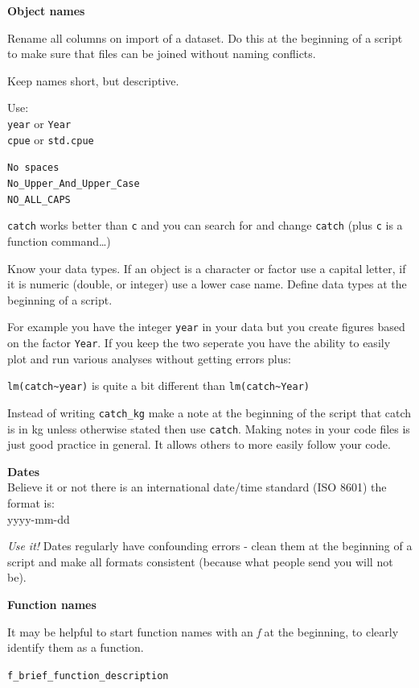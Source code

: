 \documentclass[
]{article}
\begin{document}
\textbf{Object names}

Rename all columns on import of a dataset. Do this at the beginning of a
script to make sure that files can be joined without naming conflicts.

Keep names short, but descriptive.

Use:\\
\texttt{year} or \texttt{Year}\\
\texttt{cpue} or \texttt{std.cpue}

\texttt{No\ spaces}~\\
\texttt{No\_Upper\_And\_Upper\_Case}~\\
\texttt{NO\_ALL\_CAPS}

\texttt{catch} works better than \texttt{c} and you can search for and
change \texttt{catch} (plus \texttt{c} is a function command\ldots)

Know your data types. If an object is a character or factor use a
capital letter, if it is numeric (double, or integer) use a lower case
name. Define data types at the beginning of a script.

For example you have the integer \texttt{year} in your data but you
create figures based on the factor \texttt{Year}. If you keep the two
seperate you have the ability to easily plot and run various analyses
without getting errors plus:

\texttt{lm(catch\textasciitilde{}year)} is quite a bit different than
\texttt{lm(catch\textasciitilde{}Year)}

Instead of writing \texttt{catch\_kg} make a note at the beginning of
the script that catch is in kg unless otherwise stated then use
\texttt{catch}. Making notes in your code files is just good practice in
general. It allows others to more easily follow your code.

\textbf{Dates}\\
Believe it or not there is an international date/time standard (ISO
8601) the format is:\\
yyyy-mm-dd

\emph{Use it!} Dates regularly have confounding errors - clean them at
the beginning of a script and make all formats consistent (because what
people send you will not be).

\textbf{Function names}

It may be helpful to start function names with an \emph{f} at the
beginning, to clearly identify them as a function.

\texttt{f\_brief\_function\_description}
\end{document}
